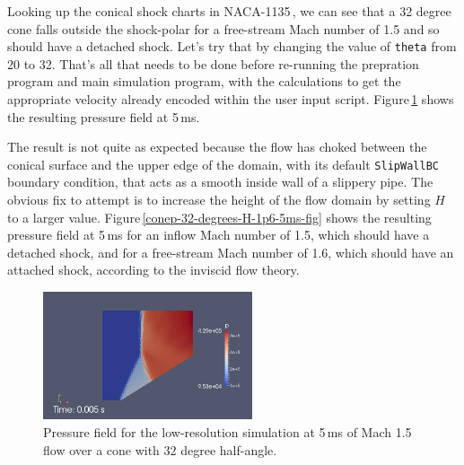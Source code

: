 \medskip
Looking up the conical shock charts in NACA-1135\,\cite{ames_53}, we can see that a 32 degree cone 
falls outside the shock-polar for a free-stream Mach number of 1.5 and so should have a detached shock.
Let's try that by changing the value of \verb!theta! from 20 to 32.
That's all that needs to be done before re-running the prepration program and main simulation program,
with the calculations to get the appropriate velocity already encoded within the user input script.
Figure\,\ref{conep-32-degrees-fig} shows the resulting pressure field at 5\,ms.

\medskip
The result is not quite as expected because the flow has choked between the conical surface and
the upper edge of the domain, with its default \verb!SlipWallBC! boundary condition, 
that acts as a smooth inside wall of a slippery pipe.
The obvious fix to attempt is to increase the height of the flow domain 
by setting $H$ to a larger value.
Figure\,\ref{conep-32-degrees-H-1p6-5ms-fig} shows the resulting pressure field at 5\,ms 
for an inflow Mach number of 1.5, which should have a detached shock, and
for a free-stream Mach number of 1.6, which should have an attached shock, 
according to the inviscid flow theory.

\begin{figure}[htbp]
\begin{center}
\includegraphics[width=0.55\textwidth]{../2D/cone20-parametric/conep-M1p5-32degree-H-1-p-field-5ms.png}
\end{center}
\caption{Pressure field for the low-resolution simulation at 5\,ms
         of Mach 1.5 flow over a cone with 32 degree half-angle.}
\label{conep-32-degrees-fig}
\end{figure}

